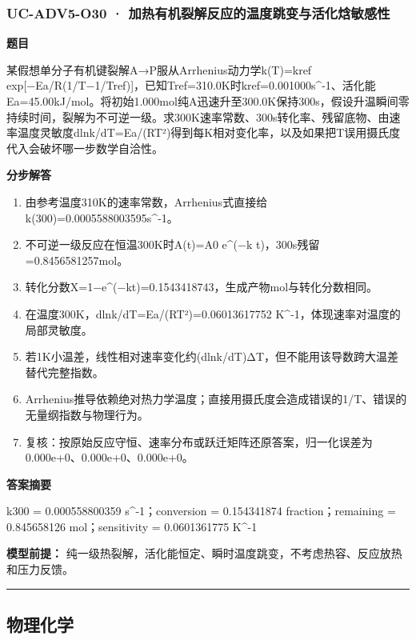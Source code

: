 \documentclass[UTF8,11pt,a4paper]{ctexart}
\begin{document}
\subsubsection*{UC-ADV5-O30 · 加热有机裂解反应的温度跳变与活化焓敏感性}
\noindent\textbf{题目}\par
某假想单分子有机键裂解A→P服从Arrhenius动力学k(T)=kref exp[−Ea/R(1/T−1/Tref)]，已知Tref=310.0K时kref=0.001000s\textasciicircum{}-1、活化能Ea=45.00kJ/mol。将初始1.000mol纯A迅速升至300.0K保持300s，假设升温瞬间零持续时间，裂解为不可逆一级。求300K速率常数、300s转化率、残留底物、由速率温度灵敏度dlnk/dT=Ea/(RT²)得到每K相对变化率，以及如果把T误用摄氏度代入会破坏哪一步数学自洽性。\par
\medskip\noindent\textbf{分步解答}
\begin{enumerate}
\item 由参考温度310K的速率常数，Arrhenius式直接给k(300)=0.0005588003595s\textasciicircum{}-1。
\item 不可逆一级反应在恒温300K时A(t)=A0 e\textasciicircum{}(−k t)，300s残留=0.8456581257mol。
\item 转化分数X=1−e\textasciicircum{}(−kt)=0.1543418743，生成产物mol与转化分数相同。
\item 在温度300K，dlnk/dT=Ea/(RT²)=0.06013617752 K\textasciicircum{}-1，体现速率对温度的局部灵敏度。
\item 若1K小温差，线性相对速率变化约(dlnk/dT)ΔT，但不能用该导数跨大温差替代完整指数。
\item Arrhenius推导依赖绝对热力学温度；直接用摄氏度会造成错误的1/T、错误的无量纲指数与物理行为。
\item 复核：按原始反应守恒、速率分布或跃迁矩阵还原答案，归一化误差为0.000e+0、0.000e+0、0.000e+0。
\end{enumerate}
\noindent\textbf{答案摘要}\par
k300 = 0.000558800359 s\textasciicircum{}-1；conversion = 0.154341874 fraction；remaining = 0.845658126 mol；sensitivity = 0.0601361775 K\textasciicircum{}-1\par
\noindent\textbf{模型前提：}
纯一级热裂解，活化能恒定、瞬时温度跳变，不考虑热容、反应放热和压力反馈。\par
\medskip\hrule\medskip
\subsection*{物理化学}
\end{document}
